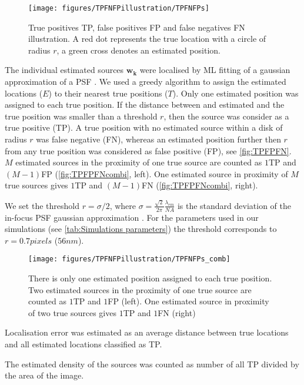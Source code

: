 \begin{figure}[!h]
	\centering
	\texttt{[image: figures/TPFNFPillustration/TPFNFPs]}
	\caption{True positives TP, false positives FP and false negatives FN illustration. A red dot represents the true location with a circle of radius $r$, a green cross denotes an estimated position.}
	\label{fig:TPFPFN}
\end{figure}

The individual estimated sources $\bm{w_{k}}$ were localised by ML fitting of a gaussian approximation of a PSF \cite{Zhang2007}. We used a greedy algorithm to assign the estimated locations ($E$) to their nearest true positions ($T$). Only one estimated position was assigned to each true position. If the distance between and estimated and the true position was smaller than a threshold $r$, then the source was consider as a true positive (TP). A true position with no estimated source within a disk of radius $r$ was false negative (FN), whereas an estimated position further then $r$ from any true position was considered as false positive (FP), see \autoref{fig:TPFPFN}. $M$ estimated sources in the proximity of one true source are counted as $1$TP and $(M-1)$FP (\autoref{fig:TPFPFNcombi}, left). One estimated source in proximity of $M$ true sources gives $1$TP and $(M-1)$FN (\autoref{fig:TPFPFNcombi}, right).

We set the threshold $r=\sigma/2$, where $\sigma=\frac{\sqrt{2}}{2\pi}\frac{\lambda_{em}}{NA}$ is the standard deviation of the in-focus PSF gaussian approximation \cite{Zhang2007}. For the parameters used in our simulations (see \autoref{tab:Simulations parameters}) the threshold corresponds to $r=0.7\unit{pixels}$ ($56\unit{nm}$). 

\begin{figure}[!h]
	\centering
	\texttt{[image: figures/TPFNFPillustration/TPFNFPs\_comb]}
	\caption{There is only one estimated position assigned to each true position. Two estimated sources in the proximity of one true source are counted as $1$TP and $1$FP (left). One estimated source in proximity of two true sources gives $1$TP and $1$FN (right)}
	\label{fig:TPFPFNcombi}
\end{figure}

Localisation error was estimated as an average distance between true locations and all estimated locations classified as TP. 

The estimated density of the sources was counted as number of all TP divided by the area of the image.

